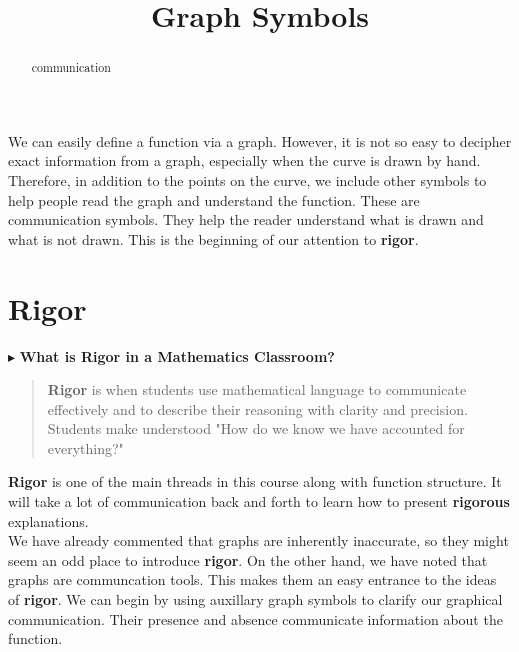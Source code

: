 \documentclass{ximera}
\title{Graph Symbols}
\begin{document}
\begin{abstract}
communication
\end{abstract}
\maketitle



We can easily define a function via a graph.  However, it is not so easy to decipher exact information from a graph, especially when the curve is drawn by hand.  Therefore, in addition to the points on the curve, we include other symbols to help people read the graph and understand the function.  These are communication symbols.  They help the reader understand what is drawn and what is not drawn.  This is the beginning of our attention to \textbf{\textcolor{purple!85!blue}{rigor}}.



\section{Rigor}

$\blacktriangleright$ \textbf{\textcolor{purple!85!blue}{What is Rigor in a Mathematics Classroom?}} \\


\begin{quote}
\textbf{\textcolor{purple!85!blue}{Rigor}} is when students use mathematical language to communicate effectively and to describe their reasoning with clarity and precision.  Students make understood "How do we know we have accounted for everything?"
\end{quote}



\textbf{\textcolor{purple!85!blue}{Rigor}} is one of the main threads in this course along with function structure.  It will take a lot of communication back and forth to learn how to present \textbf{\textcolor{purple!85!blue}{rigorous}} explanations. \\


We have already commented that graphs are inherently inaccurate, so they might seem an odd place to introduce \textbf{\textcolor{purple!85!blue}{rigor}}.  On the other hand, we have noted that graphs are communcation tools. This makes them an easy entrance to the ideas of \textbf{\textcolor{purple!85!blue}{rigor}}.  We can begin by using auxillary graph symbols to clarify our graphical communication. Their presence and absence communicate information about the function.
\end{document}
